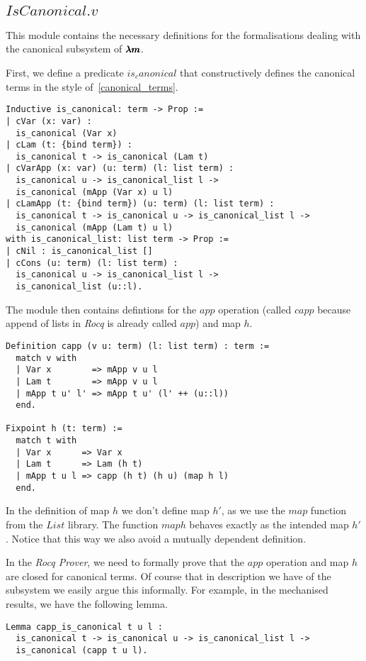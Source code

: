 \subsection{\lst$IsCanonical.v$}

This module contains the necessary definitions for the formalisations dealing with the canonical subsystem of $\pmb{\lambda m}$.

First, we define a predicate \lst$is_canonical$ that constructively defines the canonical terms in the style of~\cref{canonical_terms}.
\begin{lstlisting}[language=Coq]
Inductive is_canonical: term -> Prop :=
| cVar (x: var) :
  is_canonical (Var x)
| cLam (t: {bind term}) :
  is_canonical t -> is_canonical (Lam t)
| cVarApp (x: var) (u: term) (l: list term) :
  is_canonical u -> is_canonical_list l ->
  is_canonical (mApp (Var x) u l)
| cLamApp (t: {bind term}) (u: term) (l: list term) :
  is_canonical t -> is_canonical u -> is_canonical_list l ->
  is_canonical (mApp (Lam t) u l)
with is_canonical_list: list term -> Prop :=
| cNil : is_canonical_list []
| cCons (u: term) (l: list term) :
  is_canonical u -> is_canonical_list l ->
  is_canonical_list (u::l).
\end{lstlisting}

The module then contains defintions for the $app$ operation (called \lst$capp$ because append of lists in \textit{Rocq} is already called \lst$app$) and map $h$.
\begin{lstlisting}[language=Coq]
Definition capp (v u: term) (l: list term) : term :=
  match v with
  | Var x        => mApp v u l
  | Lam t        => mApp v u l
  | mApp t u' l' => mApp t u' (l' ++ (u::l))
  end.

Fixpoint h (t: term) :=
  match t with
  | Var x      => Var x
  | Lam t      => Lam (h t)
  | mApp t u l => capp (h t) (h u) (map h l)
  end.
\end{lstlisting}
In the definition of map $h$ we don't define map $h'$, as we use the \lst$map$ function from the \lst$List$ library.
The function \lst$map h$ behaves exactly as the intended map $h'$.
Notice that this way we also avoid a mutually dependent definition.

In the \textit{Rocq Prover}, we need to formally prove that the $app$ operation and map $h$ are closed for canonical terms.
Of course that in description we have of the subsystem we easily argue this informally. For example, in the mechanised results, we have the following lemma.
\begin{lstlisting}[language=Coq]
Lemma capp_is_canonical t u l :
  is_canonical t -> is_canonical u -> is_canonical_list l ->
  is_canonical (capp t u l).
\end{lstlisting}

